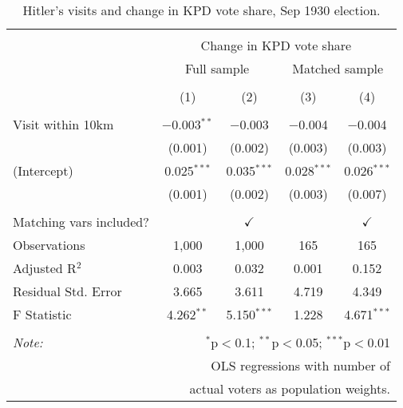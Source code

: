 
\begin{table}[!htbp] \centering 
  \caption{Hitler's visits and change in KPD vote share, Sep 1930 election.} 
  \label{tab:ols-d_p_kpd-1} 
\begin{tabular}{@{\extracolsep{5pt}}lcccc} 
\\[-1.8ex]\hline 
\hline \\[-1.8ex] 
 & \multicolumn{4}{c}{Change in KPD vote share} \\ 
\cline{2-5} 
 & \multicolumn{2}{c}{Full sample} & \multicolumn{2}{c}{Matched sample} \\ 
\\[-1.8ex] & (1) & (2) & (3) & (4)\\ 
\hline \\[-1.8ex] 
 Visit within 10km & $-$0.003$^{**}$ & $-$0.003 & $-$0.004 & $-$0.004 \\ 
  & (0.001) & (0.002) & (0.003) & (0.003) \\ 
  (Intercept) & 0.025$^{***}$ & 0.035$^{***}$ & 0.028$^{***}$ & 0.026$^{***}$ \\ 
  & (0.001) & (0.002) & (0.003) & (0.007) \\ 
 \hline \\[-1.8ex] 
Matching vars included? &  & \multicolumn{1}{c}{$\checkmark$} &  & \multicolumn{1}{c}{$\checkmark$} \\ 
Observations & 1,000 & 1,000 & 165 & 165 \\ 
Adjusted R$^{2}$ & 0.003 & 0.032 & 0.001 & 0.152 \\ 
Residual Std. Error & 3.665 & 3.611 & 4.719 & 4.349 \\ 
F Statistic & 4.262$^{**}$ & 5.150$^{***}$ & 1.228 & 4.671$^{***}$ \\ 
\hline 
\hline \\[-1.8ex] 
\textit{Note:}  & \multicolumn{4}{r}{$^{*}$p$<$0.1; $^{**}$p$<$0.05; $^{***}$p$<$0.01} \\ 
 & \multicolumn{4}{r}{OLS regressions with number of} \\ 
 & \multicolumn{4}{r}{actual voters as population weights.} \\ 
\end{tabular} 
\end{table} 
